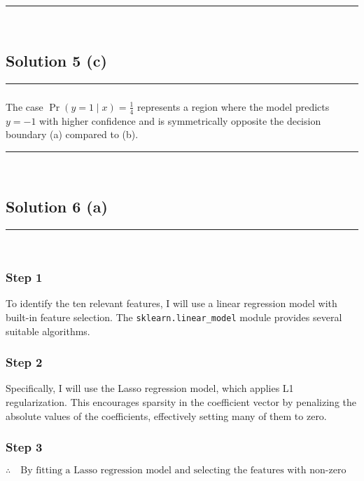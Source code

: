 \documentclass{article}
\begin{document}
\noindent\rule{\textwidth}{0.4pt}\\

\newpage

\subsection*{Solution 5 (c)}
\noindent\rule{\textwidth}{0.4pt}

\subsubsection*{}

\parbox{\textwidth}{
The case $\operatorname{Pr}(y=1 \mid x) = \frac{1}{4}$ represents a region where the model predicts $y=-1$ with higher confidence and is symmetrically opposite the decision boundary (a) compared to (b).
}
\noindent\rule{\textwidth}{0.4pt}\\

\newpage
\subsection*{Solution 6 (a)}
\noindent\rule{\textwidth}{0.4pt}\\

\subsubsection*{Step 1}
\parbox{\textwidth}{
To identify the ten relevant features, I will use a linear regression model with built-in feature selection. The \texttt{sklearn.linear\_model} module provides several suitable algorithms.
}

\subsubsection*{Step 2}
\parbox{\textwidth}{
Specifically, I will use the Lasso regression model, which applies L1 regularization. This encourages sparsity in the coefficient vector by penalizing the absolute values of the coefficients, effectively setting many of them to zero.
}

\subsubsection*{Step 3}
\parbox{\textwidth}{
\[
\therefore \quad \text{By fitting a Lasso regression model and selecting the features with non-zero coefficients, I can identify the ten relevant features.}
\]
}
\end{document}
